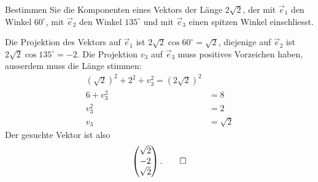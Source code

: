 Bestimmen Sie die Komponenten eines Vektors der Länge $2\sqrt{2}$,
der mit $\vec e_1$ den Winkel $60^\circ$, mit $\vec e_2$ den Winkel
$135^\circ$ und mit $\vec e_3$ einen spitzen Winkel einschliesst.

\begin{loesung}
Die Projektion des Vektors auf $\vec e_1$ ist $2\sqrt{2}\cos 60^\circ=\sqrt{2}$,
diejenige auf $\vec e_2$ ist $2\sqrt{2}\cos135^\circ=-2$. Die Projektion $v_3$
auf $\vec e_3$ muss positives Vorzeichen haben, ausserdem muss die
Länge stimmen:
\begin{align*}
(\sqrt{2})^2+2^2+v_3^2=(2\sqrt{2})^2\\
6+v_3^2&=8\\
v_3^2&=2\\
v_3&=\sqrt {2}
\end{align*}
Der gesuchte Vektor ist also
\[
\begin{pmatrix}\sqrt{2}\\-2\\\sqrt{2}\end{pmatrix}.
\qedhere
\]
\end{loesung}

